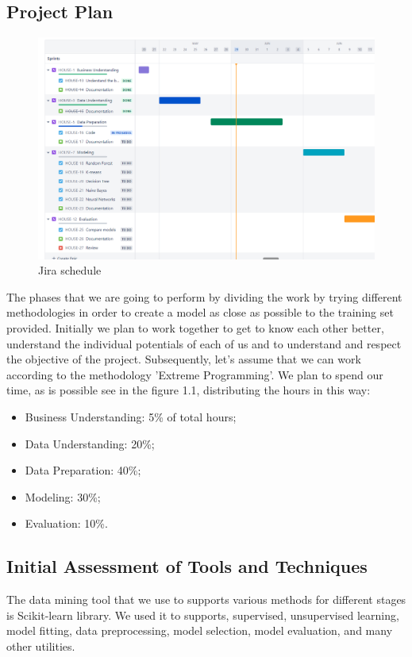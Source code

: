\subsection{Project Plan}

\begin{figure}[t]
    \includegraphics[scale=0.45]{imgs/jira_schedule.png}
    \centering
    \caption{Jira schedule}
    \hrulefill\vspace{15pt}\par
\end{figure}

The phases that we are going to perform by dividing the work by trying different methodologies in order to create a model as close as possible to the training set provided. Initially we plan to work together to get to know each other better, understand the individual potentials of each of us and to understand and respect the objective of the project. Subsequently, let's assume that we can work according to the methodology 'Extreme Programming'.
We plan to spend our time, as is possible see in the figure 1.1, distributing the hours in this way:
\begin{itemize}
\item Business Understanding: 5\% of total hours;
\item Data Understanding: 20\%;
\item Data Preparation: 40\%; 
\item Modeling: 30\%;
\item Evaluation: 10\%.
\end{itemize}

\subsection{Initial Assessment of Tools and
Techniques}
The data mining tool that we use to supports various methods for different stages is Scikit-learn library. We used it to supports, supervised, unsupervised learning, model fitting, data preprocessing, model selection, model evaluation, and many other utilities.